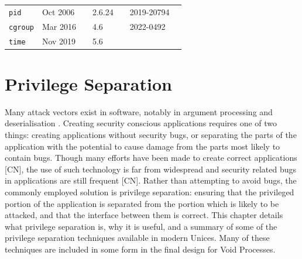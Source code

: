 \documentclass[a4paper,12pt,twoside,openright]{report}
\begin{document}
\begin{table}
\begin{center}
\begin{tabular}{l|lr|lr|l|l}
        \texttt{pid}
            & Oct 2006 & \citep{bhattiprolu_patch_2006}
            & 2.6.24 & \citep{noauthor_linux_2008}
            & 2019-20794
            & \\

        \texttt{cgroup}
            & Mar 2016 & \citep{heo_git_2016}
            & 4.6 & \citep{torvalds_linux_2016}
            & 2022-0492
            & \\

        \texttt{time}
            & Nov 2019 & \citep{vagin_ns_2020}
            & 5.6 & \citep{noauthor_linux_2020}
            &
            &

    \end{tabular}
    \end{center}

    \label{tab:namespaces}
\end{table}


\chapter{Privilege Separation}
\label{chap:priv-sep}

Many attack vectors exist in software, notably in argument processing and deserialisation \citep{the_mitre_corporation_improper_2006,the_mitre_corporation_deserialization_2006}. Creating security conscious applications requires one of two things: creating applications without security bugs, or separating the parts of the application with the potential to cause damage from the parts most likely to contain bugs. Though many efforts have been made to create correct applications [CN], the use of such technology is far from widespread and security related bugs in applications are still frequent [CN]. Rather than attempting to avoid bugs, the commonly employed solution is privilege separation: ensuring that the privileged portion of the application is separated from the portion which is likely to be attacked, and that the interface between them is correct. This chapter details what privilege separation is, why it is useful, and a summary of some of the privilege separation techniques available in modern Unices. Many of these techniques are included in some form in the final design for Void Processes.
\end{document}
